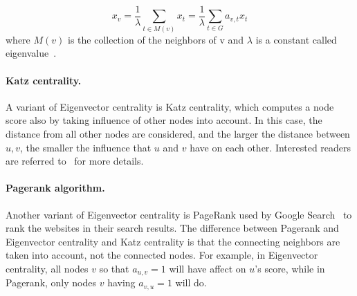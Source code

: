 \begin{equation}
	\label{eq:eigenvector}
	x_v = \frac{1}{\lambda} \sum_{t \in M(v)}x_t = \frac{1}{\lambda} \sum_{t \in G} a_{v,t}x_t
\end{equation}
where $M(v)$ is the collection of the neighbors of v and $\lambda$ is a constant called eigenvalue~\cite{Eigenvecto-wiki}.


\paragraph{Katz centrality.} A variant of Eigenvector centrality is Katz centrality, which computes a node score also by taking influence of other nodes into account. In this case, the distance from all other nodes are considered, and the larger the distance between $u, v$, the smaller the influence that $u$ and $v$ have on each other. Interested readers are referred to~\cite{katz-wiki} for more details.

\paragraph{Pagerank algorithm.} Another variant of Eigenvector centrality is PageRank used by Google Search~\cite{pagerank-wiki} to rank the websites in their search results. The difference between Pagerank and Eigenvector centrality and Katz centrality is that the connecting neighbors are taken into account, not the connected nodes. For example, in Eigenvector centrality, all nodes $v$ so that $a_{u, v}= 1$ will have affect on $u$'s score, while in Pagerank, only nodes $v$ having $a_{v, u} = 1$ will do.
